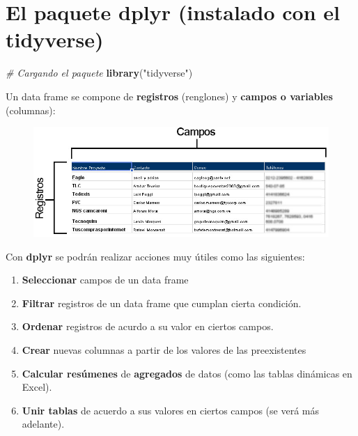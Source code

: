 \documentclass[]{book}
\newenvironment{Shaded}{\begin{snugshade}}{\end{snugshade}}
\newcommand{\KeywordTok}[1]{\textcolor[rgb]{0.13,0.29,0.53}{\textbf{#1}}}
\newcommand{\StringTok}[1]{\textcolor[rgb]{0.31,0.60,0.02}{#1}}
\newcommand{\CommentTok}[1]{\textcolor[rgb]{0.56,0.35,0.01}{\textit{#1}}}
\newcommand{\NormalTok}[1]{#1}
\providecommand{\tightlist}{%
  \setlength{\itemsep}{0pt}\setlength{\parskip}{0pt}}
\theoremstyle{definition}
\theoremstyle{definition}
\theoremstyle{definition}
\theoremstyle{remark}
\begin{document}
\section{El paquete dplyr (instalado con el
tidyverse)}\label{el-paquete-dplyr-instalado-con-el-tidyverse}

\begin{Shaded}
\begin{Highlighting}[]
\CommentTok{# Cargando el paquete}
\KeywordTok{library}\NormalTok{(}\StringTok{"tidyverse"}\NormalTok{)}
\end{Highlighting}
\end{Shaded}

Un data frame se compone de \textbf{registros} (renglones) y
\textbf{campos o variables} (columnas):

\begin{figure}
\centering
\includegraphics{imagenes/campos_registros.jpg}
\caption{}
\end{figure}

Con \textbf{dplyr} se podrán realizar acciones muy útiles como las
siguientes:

\begin{enumerate}
\def\labelenumi{\arabic{enumi}.}
\tightlist
\item
  \textbf{Seleccionar} campos de un data frame
\item
  \textbf{Filtrar} registros de un data frame que cumplan cierta
  condición.
\item
  \textbf{Ordenar} registros de acurdo a su valor en ciertos campos.
\item
  \textbf{Crear} nuevas columnas a partir de los valores de las
  preexistentes
\item
  \textbf{Calcular resúmenes} de \textbf{agregados} de datos (como las
  tablas dinámicas en Excel).
\item
  \textbf{Unir tablas} de acuerdo a sus valores en ciertos campos (se
  verá más adelante).
\end{enumerate}
\end{document}
